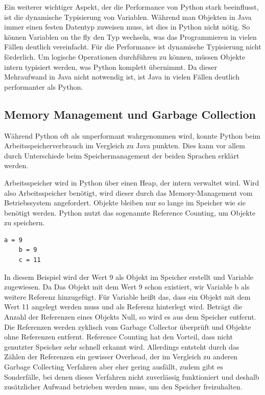 Ein weiterer wichtiger Aspekt, der die Performance von Python stark beeinflusst, ist die dynamische Typisierung von Variablen. 
Während man Objekten in Java immer einen festen Datentyp zuweisen muss, ist dies in Python nicht nötig. So können Variablen on the 
fly den Typ wechseln, was das Programmieren in vielen Fällen deutlich vereinfacht. Für die Performance ist dynamische Typisierung 
nicht förderlich. Um logische Operationen durchführen zu können, müssen Objekte intern typisiert werden, was Python komplett übernimmt. 
Da dieser Mehraufwand in Java nicht notwendig ist, ist Java in vielen Fällen deutlich performanter als Python.\autocite[Vgl.][]{Shaw.16.7.2018}


\subsection{Memory Management und Garbage Collection}
Während Python oft als unperformant wahrgenommen wird, konnte Python beim Arbeitsspeicherverbrauch im Vergleich 
zu Java punkten. Dies kann vor allem durch Unterschiede beim Speichermanagement der beiden Sprachen erklärt werden. 

Arbeitsspeicher wird in Python über einen Heap, der intern verwaltet wird. Wird also Arbeitsspeicher benötigt, 
wird dieser durch das Memory-Management vom Betriebssystem angefordert. Objekte bleiben nur so lange im Speicher 
wie sie benötigt werden. Python nutzt das sogenannte Reference Counting, um Objekte zu speichern.

\begin{lstlisting}[caption={Codebeispiel zur Verwaltung von Objekten in Python}]
    a = 9
    b = 9
    c = 11
\end{lstlisting}

In diesem Beispiel wird der Wert 9 als Objekt im Speicher erstellt und Variable  zugewiesen. Da 
Das Objekt mit dem Wert 9 schon existiert, wir Variable {b} als weitere Referenz hinzugefügt. Für Variable 
 heißt das, dass ein Objekt mit dem Wert 11 angelegt werden muss und  als Referenz hinterlegt wird. 
Beträgt die Anzahl der Referenzen eines Objekts Null, so wird es aus dem Speicher entfernt. Die Referenzen 
werden zyklisch vom Garbage Collector überprüft und Objekte ohne Referenzen entfernt.\autocite[Vgl.][]{PabloGalindoSalgado.2021} 
Reference Counting hat den Vorteil, dass nicht genutzter Speicher sehr schnell erkannt wird. Allerdings entsteht durch das Zählen 
der Referenzen ein gewisser Overhead, der im Vergleich zu anderen Garbage Collecting Verfahren aber eher gering ausfällt, 
zudem gibt es Sonderfälle, bei denen dieses Verfahren nicht zuverlässig funktioniert und deshalb zusätzlicher Aufwand 
betrieben werden muss, um den Speicher freizuhalten.

